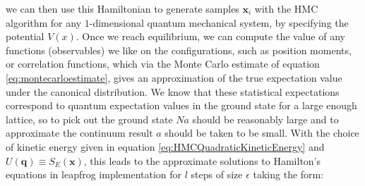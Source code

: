 \documentclass[12pt]{article}
\begin{document}
    we can then use this Hamiltonian to generate samples $\bm{x}_i$ with the HMC algorithm for any $1$-dimensional quantum mechanical system, by specifying the potential $V\left(x\right)$. Once we reach equilibrium, we can compute the value of any functions (observables) we like on the configurations, such as position moments, or correlation functions, which via the Monte Carlo estimate of equation \ref{eq:montecarloestimate}, gives an approximation of the true expectation value under the canonical distribution. We know that these statistical expectations correspond to quantum expectation values in the ground state for a large enough lattice, so to pick out the ground state $Na$ should be reasonably large and to approximate the continuum result $a$ should be taken to be small.  With the choice of kinetic energy given in equation \ref{eq:HMCQuadraticKineticEnergy} and $U\left(\bm{q}\right) \equiv S_E\left(\bm{x}\right)$, this leads to the approximate solutions to Hamilton's equations in leapfrog implementation for $l$ steps of size $\epsilon$ taking the form:
\end{document}
